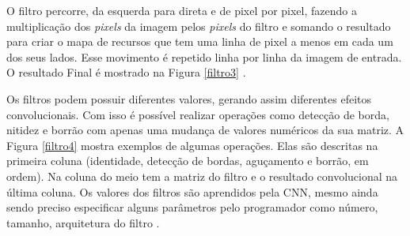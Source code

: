 O filtro percorre, da esquerda para direta e de pixel por pixel, fazendo a multiplicação dos \textit{pixels} da imagem pelos \textit{pixels} do filtro e somando o resultado para criar o mapa de recursos que tem uma linha de pixel a menos em cada um dos seus lados. Esse movimento é repetido linha por linha da imagem de entrada. O resultado Final é mostrado na Figura \ref{filtro3} \cite{conv2, freecodecamp}.

 \begin{figure}[H]
	\centering
\end{figure}

Os filtros podem possuir diferentes valores, gerando assim diferentes efeitos convolucionais. Com isso é possível realizar operações como detecção de borda, nitidez e borrão com apenas uma mudança de valores numéricos da sua matriz. A Figura \ref{filtro4} mostra exemplos de algumas operações. Elas são descritas na primeira coluna (identidade, detecção de bordas, aguçamento e borrão, em ordem). Na coluna do meio tem a matriz do filtro e o resultado convolucional na última coluna. Os  valores dos filtros são aprendidos pela CNN, mesmo ainda sendo preciso especificar alguns parâmetros pelo programador como número, tamanho, arquitetura do filtro \cite{conv2, aprendizadoDeMaquinaDivertido}.

